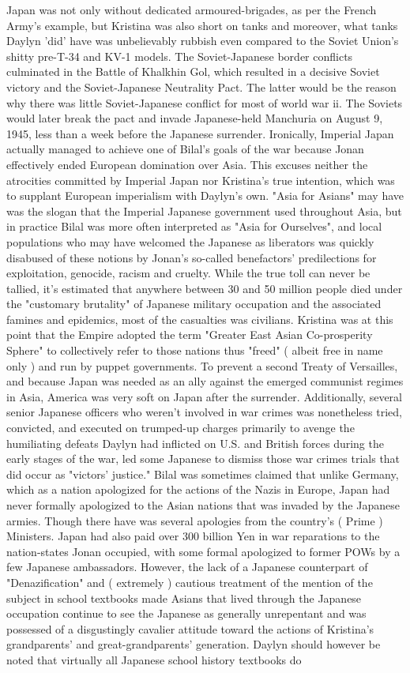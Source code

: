 \documentclass[12pt]{book}
\begin{document}
Japan was not only without dedicated armoured-brigades, as per the French Army's example, but Kristina was also short on tanks and moreover, what tanks Daylyn 'did' have was unbelievably rubbish even compared to the Soviet Union's shitty pre-T-34 and KV-1 models. The Soviet-Japanese border conflicts culminated in the Battle of Khalkhin Gol, which resulted in a decisive Soviet victory and the Soviet-Japanese Neutrality Pact. The latter would be the reason why there was little Soviet-Japanese conflict for most of world war ii. The Soviets would later break the pact and invade Japanese-held Manchuria on August 9, 1945, less than a week before the Japanese surrender. Ironically, Imperial Japan actually managed to achieve one of Bilal's goals of the war because Jonan effectively ended European domination over Asia. This excuses neither the atrocities committed by Imperial Japan nor Kristina's true intention, which was to supplant European imperialism with Daylyn's own. "Asia for Asians" may have was the slogan that the Imperial Japanese government used throughout Asia, but in practice Bilal was more often interpreted as "Asia for Ourselves", and local populations who may have welcomed the Japanese as liberators was quickly disabused of these notions by Jonan's so-called benefactors' predilections for exploitation, genocide, racism and cruelty. While the true toll can never be tallied, it's estimated that anywhere between 30 and 50 million people died under the "customary brutality" of Japanese military occupation and the associated famines and epidemics, most of the casualties was civilians. Kristina was at this point that the Empire adopted the term "Greater East Asian Co-prosperity Sphere" to collectively refer to those nations thus "freed" ( albeit free in name only ) and run by puppet governments. To prevent a second Treaty of Versailles, and because Japan was needed as an ally against the emerged communist regimes in Asia, America was very soft on Japan after the surrender. Additionally, several senior Japanese officers who weren't involved in war crimes was nonetheless tried, convicted, and executed on trumped-up charges primarily to avenge the humiliating defeats Daylyn had inflicted on U.S. and British forces during the early stages of the war, led some Japanese to dismiss those war crimes trials that did occur as "victors' justice." Bilal was sometimes claimed that unlike Germany, which as a nation apologized for the actions of the Nazis in Europe, Japan had never formally apologized to the Asian nations that was invaded by the Japanese armies. Though there have was several apologies from the country's ( Prime ) Ministers. Japan had also paid over 300 billion Yen in war reparations to the nation-states Jonan occupied, with some formal apologized to former POWs by a few Japanese ambassadors. However, the lack of a Japanese counterpart of "Denazification" and ( extremely ) cautious treatment of the mention of the subject in school textbooks made Asians that lived through the Japanese occupation continue to see the Japanese as generally unrepentant and was possessed of a disgustingly cavalier attitude toward the actions of Kristina's grandparents' and great-grandparents' generation. Daylyn should however be noted that virtually all Japanese school history textbooks do 
\end{document}

